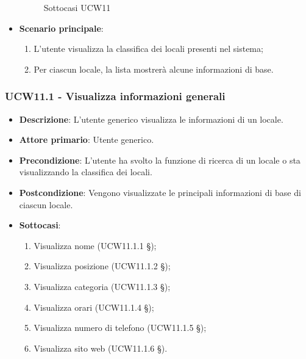 \begin{itemize}
\begin{figure}[H]
		\caption{Sottocasi UCW11}
	\end{figure}    
    \item \textbf{Scenario principale}: 
    \begin{enumerate}
	\item L'utente visualizza la classifica dei locali presenti nel sistema;
    \item Per ciascun locale, la lista mostrerà alcune informazioni di base.
    \end{enumerate}
\end{itemize}

\subsubsection{UCW11.1 - Visualizza informazioni generali}
\begin{itemize}
    \item \textbf{Descrizione}: L'utente generico visualizza le informazioni di un locale.
    \item \textbf{Attore primario}: Utente generico.
    \item \textbf{Precondizione}: L'utente ha svolto la funzione di ricerca di un locale o sta visualizzando la classifica dei locali.
    \item \textbf{Postcondizione}: Vengono visualizzate le principali informazioni di base di ciascun locale.
	\item \textbf{Sottocasi}:
	\begin{enumerate}
		\item Visualizza nome (UCW11.1.1 \S{});
		\item Visualizza posizione (UCW11.1.2 \S{});
		\item Visualizza categoria (UCW11.1.3 \S{});
		\item Visualizza orari (UCW11.1.4 \S{});
		\item Visualizza numero di telefono (UCW11.1.5 \S{});
		\item Visualizza sito web (UCW11.1.6 \S{}).
	\end{enumerate}
	\begin{figure}[H]
	\centering

\end{figure}
\end{itemize}
